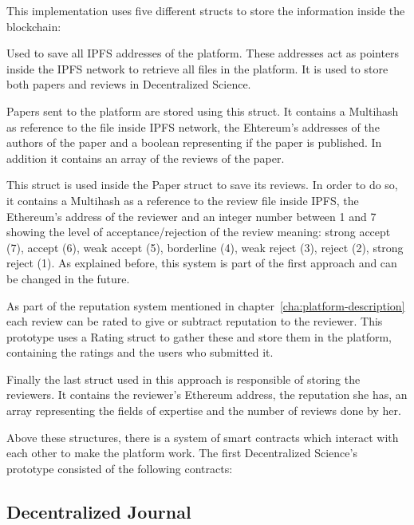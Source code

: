 This implementation uses five different structs to store the information inside
the blockchain:

\begin{itemize}
   Used to save all IPFS addresses of the platform.
  These addresses act as pointers inside the IPFS network to retrieve all files
  in the platform. It is used to store both papers and reviews in Decentralized
  Science.

   Papers sent to the platform are stored using this struct.
  It contains a Multihash as reference to the file inside IPFS network, the
  Ehtereum's addresses of the authors of the paper and a boolean representing if
  the paper is published. In addition it contains an array of the reviews of the
  paper.

   This struct is used inside the Paper struct to save its
  reviews. In order to do so, it contains a Multihash as a reference to the
  review file inside IPFS, the Ethereum's address of the reviewer and an integer
  number between 1 and 7 showing the level of acceptance/rejection of the review
  meaning: strong accept (7), accept (6), weak accept (5), borderline (4), weak
  reject (3), reject (2), strong reject (1). As explained before, this system is
  part of the first approach and can be changed in the future.

   As part of the reputation system mentioned in
  chapter~\ref{cha:platform-description} each review can be rated to give or
  subtract reputation to the reviewer. This prototype uses a Rating struct to
  gather these and store them in the platform, containing the ratings and the
  users who submitted it.

   Finally the last struct used in this approach is responsible
  of storing the reviewers. It contains the reviewer's Ethereum address, the
  reputation she has, an array representing the fields of expertise and the
  number of reviews done by her.
  
\end{itemize}

Above these structures, there is a system of smart contracts which interact with
each other to make the platform work. The first Decentralized Science's
prototype consisted of the following contracts:

\subsection*{Decentralized Journal}
\label{sec:decentr-journ}

